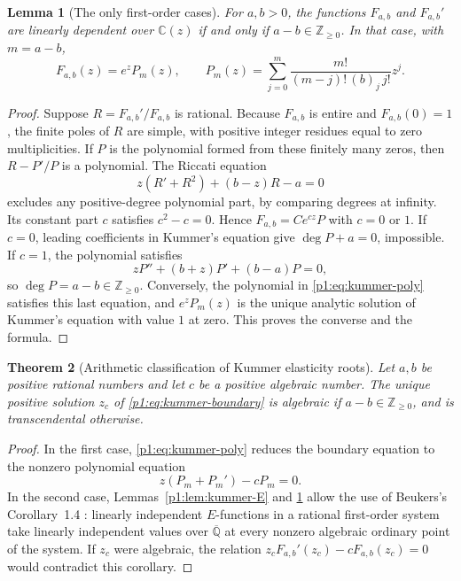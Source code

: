 \documentclass[11pt,a4paper]{article}
\newtheorem{theorem}{Theorem}[section]
\newtheorem{lemma}[theorem]{Lemma}
\theoremstyle{definition}
\theoremstyle{remark}
\numberwithin{equation}{section}
\begin{document}
\begin{lemma}[The only first-order cases]
\label{p1:lem:kummer-logder}
For $a,b>0$, the functions $F_{a,b}$ and $F_{a,b}'$ are linearly
dependent over $\mathbb C(z)$ if and only if $a-b\in\mathbb Z_{\ge0}$.
In that case, with $m=a-b$,
\begin{equation}\label{p1:eq:kummer-poly}
 F_{a,b}(z)=e^zP_m(z),\qquad
 P_m(z)=\sum_{j=0}^{m}
 \frac{m!}{(m-j)!\,(b)_j\,j!}z^j.
\end{equation}
\end{lemma}
\begin{proof}
Suppose $R=F_{a,b}'/F_{a,b}$ is rational. Because $F_{a,b}$ is entire
and $F_{a,b}(0)=1$, the finite poles of $R$ are simple, with positive
integer residues equal to zero multiplicities. If $P$ is the polynomial
formed from these finitely many zeros, then $R-P'/P$ is a polynomial.
The Riccati equation
\[
 z(R'+R^2)+(b-z)R-a=0
\]
excludes any positive-degree polynomial part, by comparing degrees at
infinity. Its constant part $c$ satisfies $c^2-c=0$. Hence
$F_{a,b}=Ce^{cz}P$ with $c=0$ or $1$.
If $c=0$, leading coefficients in Kummer's equation give
$\deg P+a=0$, impossible. If $c=1$, the polynomial satisfies
\[
 zP''+(b+z)P'+(b-a)P=0,
\]
so $\deg P=a-b\in\mathbb Z_{\ge0}$.
Conversely, the polynomial in \eqref{p1:eq:kummer-poly} satisfies this last
equation, and $e^zP_m(z)$ is the unique analytic solution of Kummer's
equation with value $1$ at zero. This proves the converse and the formula.
\end{proof}

\begin{theorem}[Arithmetic classification of Kummer elasticity roots]
\label{p1:thm:kummer-root-arithmetic}
Let $a,b$ be positive rational numbers and let $c$ be a positive algebraic
number. The unique positive solution $z_c$ of
\eqref{p1:eq:kummer-boundary} is algebraic if $a-b\in\mathbb Z_{\ge0}$,
and is transcendental otherwise.
\end{theorem}
\begin{proof}
In the first case, \eqref{p1:eq:kummer-poly} reduces the boundary equation
to the nonzero polynomial equation
\[
 z(P_m+P_m')-cP_m=0.
\]
In the second case, Lemmas~\ref{p1:lem:kummer-E} and
\ref{p1:lem:kummer-logder} allow the use of Beukers's
Corollary~1.4 \cite{p1:Beukers2006}: linearly independent $E$-functions in a
rational first-order system take linearly independent values over
$\overline{\mathbb Q}$ at every nonzero algebraic ordinary point of the
system. If $z_c$ were algebraic, the relation
$z_cF_{a,b}'(z_c)-cF_{a,b}(z_c)=0$ would contradict this corollary.
\end{proof}
\end{document}
